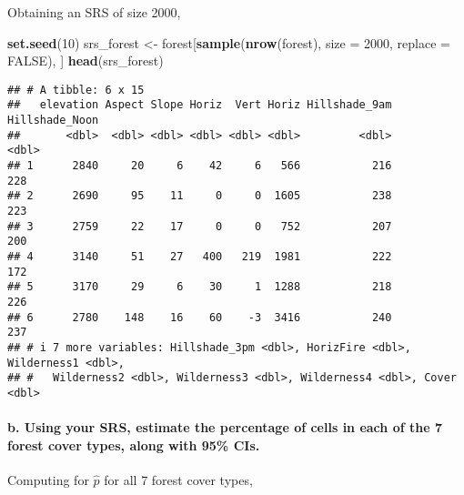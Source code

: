 \documentclass[12pt]{article}
\newenvironment{Shaded}{\begin{snugshade}}{\end{snugshade}}
\newcommand{\AttributeTok}[1]{\textcolor[rgb]{0.13,0.29,0.53}{#1}}
\newcommand{\ConstantTok}[1]{\textcolor[rgb]{0.56,0.35,0.01}{#1}}
\newcommand{\DecValTok}[1]{\textcolor[rgb]{0.00,0.00,0.81}{#1}}
\newcommand{\FunctionTok}[1]{\textcolor[rgb]{0.13,0.29,0.53}{\textbf{#1}}}
\newcommand{\NormalTok}[1]{#1}
\newcommand{\OtherTok}[1]{\textcolor[rgb]{0.56,0.35,0.01}{#1}}
\begin{document}
\hspace{0.5cm}

Obtaining an SRS of size 2000,

\begin{Shaded}
\begin{Highlighting}[]
\FunctionTok{set.seed}\NormalTok{(}\DecValTok{10}\NormalTok{)}
\NormalTok{srs\_forest }\OtherTok{\textless{}{-}}\NormalTok{ forest[}\FunctionTok{sample}\NormalTok{(}\FunctionTok{nrow}\NormalTok{(forest), }\AttributeTok{size =} \DecValTok{2000}\NormalTok{, }\AttributeTok{replace =} \ConstantTok{FALSE}\NormalTok{), ] }
\FunctionTok{head}\NormalTok{(srs\_forest)}
\end{Highlighting}
\end{Shaded}

\begin{verbatim}
## # A tibble: 6 x 15
##   elevation Aspect Slope Horiz  Vert Horiz Hillshade_9am Hillshade_Noon
##       <dbl>  <dbl> <dbl> <dbl> <dbl> <dbl>         <dbl>          <dbl>
## 1      2840     20     6    42     6   566           216            228
## 2      2690     95    11     0     0  1605           238            223
## 3      2759     22    17     0     0   752           207            200
## 4      3140     51    27   400   219  1981           222            172
## 5      3170     29     6    30     1  1288           218            226
## 6      2780    148    16    60    -3  3416           240            237
## # i 7 more variables: Hillshade_3pm <dbl>, HorizFire <dbl>, Wilderness1 <dbl>,
## #   Wilderness2 <dbl>, Wilderness3 <dbl>, Wilderness4 <dbl>, Cover <dbl>
\end{verbatim}

\paragraph{b. Using your SRS, estimate the percentage of cells in each
of the 7 forest cover types, along with 95\%
CIs.}\label{b.-using-your-srs-estimate-the-percentage-of-cells-in-each-of-the-7-forest-cover-types-along-with-95-cis.}

\hspace{0.5cm}

Computing for \(\hat p\) for all 7 forest cover types,
\end{document}
